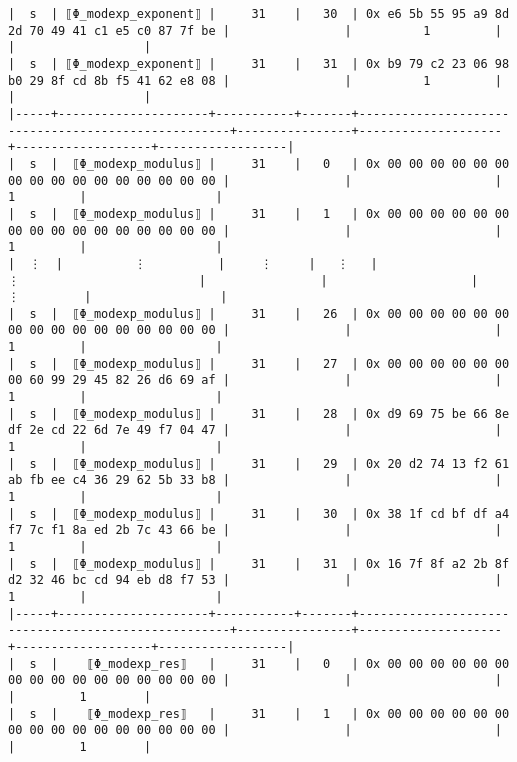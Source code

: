 \documentclass[varwidth=\maxdimen,margin=0.5cm,multi={verbatim}]{standalone}
\begin{document}
\begin{verbatim}
|  s  | ⟦Φ_modexp_exponent⟧ |     31    |   30  | 0x e6 5b 55 95 a9 8d 2d 70 49 41 c1 e5 c0 87 7f be |                |          1         |                   |                  |
|  s  | ⟦Φ_modexp_exponent⟧ |     31    |   31  | 0x b9 79 c2 23 06 98 b0 29 8f cd 8b f5 41 62 e8 08 |                |          1         |                   |                  |
|-----+---------------------+-----------+-------+----------------------------------------------------+----------------+--------------------+-------------------+------------------|
|  s  |  ⟦Φ_modexp_modulus⟧ |     31    |   0   | 0x 00 00 00 00 00 00 00 00 00 00 00 00 00 00 00 00 |                |                    |         1         |                  |
|  s  |  ⟦Φ_modexp_modulus⟧ |     31    |   1   | 0x 00 00 00 00 00 00 00 00 00 00 00 00 00 00 00 00 |                |                    |         1         |                  |
|  ⋮  |          ⋮          |     ⋮     |   ⋮   |                          ⋮                         |                |                    |         ⋮         |                  |
|  s  |  ⟦Φ_modexp_modulus⟧ |     31    |   26  | 0x 00 00 00 00 00 00 00 00 00 00 00 00 00 00 00 00 |                |                    |         1         |                  |
|  s  |  ⟦Φ_modexp_modulus⟧ |     31    |   27  | 0x 00 00 00 00 00 00 00 60 99 29 45 82 26 d6 69 af |                |                    |         1         |                  |
|  s  |  ⟦Φ_modexp_modulus⟧ |     31    |   28  | 0x d9 69 75 be 66 8e df 2e cd 22 6d 7e 49 f7 04 47 |                |                    |         1         |                  |
|  s  |  ⟦Φ_modexp_modulus⟧ |     31    |   29  | 0x 20 d2 74 13 f2 61 ab fb ee c4 36 29 62 5b 33 b8 |                |                    |         1         |                  |
|  s  |  ⟦Φ_modexp_modulus⟧ |     31    |   30  | 0x 38 1f cd bf df a4 f7 7c f1 8a ed 2b 7c 43 66 be |                |                    |         1         |                  |
|  s  |  ⟦Φ_modexp_modulus⟧ |     31    |   31  | 0x 16 7f 8f a2 2b 8f d2 32 46 bc cd 94 eb d8 f7 53 |                |                    |         1         |                  |
|-----+---------------------+-----------+-------+----------------------------------------------------+----------------+--------------------+-------------------+------------------|
|  s  |    ⟦Φ_modexp_res⟧   |     31    |   0   | 0x 00 00 00 00 00 00 00 00 00 00 00 00 00 00 00 00 |                |                    |                   |         1        |
|  s  |    ⟦Φ_modexp_res⟧   |     31    |   1   | 0x 00 00 00 00 00 00 00 00 00 00 00 00 00 00 00 00 |                |                    |                   |         1        |

\end{verbatim}
\end{document}
